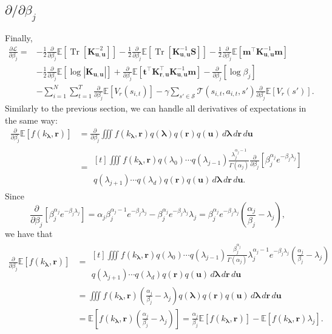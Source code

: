 \documentclass{article}
\theoremstyle{definition}
\DeclareMathOperator{\Tr}{Tr}
\newcommand{\Kuu}{\mathbf{K}_{\mathbf{u},\mathbf{u}}}
\newcommand{\Kru}{\mathbf{K}_{\mathbf{r},\mathbf{u}}}
\newcommand{\db}{\frac{\partial}{\partial\beta_j}}
\begin{document}
\subsection{$\partial/\partial\beta_j$}
Finally,
\[
  \begin{split}
    \frac{\partial\mathcal{L}}{\partial\beta_j} = &-
    \frac{1}{2}\db\mathbb{E}[\Tr[\Kuu^{-2}]] -
    \frac{1}{2}\db\mathbb{E}[\Tr[\Kuu^{-1}\mathbf{S}]] -
    \frac{1}{2}\db\mathbb{E}[\mathbf{m}^\intercal\Kuu^{-1}\mathbf{m}] \\
    &- \frac{1}{2}\db\mathbb{E}[\log|\Kuu|] +
    \db\mathbb{E}[\mathbf{t}^\intercal\Kru^\intercal\Kuu^{-1}\mathbf{m}] -
    \db[\log\beta_j] \\
    &- \sum_{i=1}^N \sum_{t=1}^T \db \mathbb{E}[V_r(s_{i,t})] - \gamma\sum_{s'
      \in \mathcal{S}} \mathcal{T}(s_{i,t}, a_{i,t}, s')\db\mathbb{E}[V_r(s')].
  \end{split}
\]
Similarly to the previous section, we can handle all derivatives of expectations
in the same way:
\[
  \begin{split}
    \db\mathbb{E}[f(k_{\bm\lambda}, \mathbf{r})] &= \db \iiint f(k_{\bm\lambda},
    \mathbf{r}) q(\bm\lambda) q(\mathbf{r})
    q(\mathbf{u})\,d\bm\lambda\,d\mathbf{r}\,d\mathbf{u} \\
    &= \!\begin{multlined}[t]
      \iiint f(k_{\bm\lambda}, \mathbf{r}) q(\lambda_0) \cdots q(\lambda_{j-1})
      \frac{\lambda_j^{\alpha_j - 1}}{\Gamma(\alpha_j)} \db [\beta_j^{\alpha_j}
      e^{-\beta_j\lambda_j}] \\
      q(\lambda_{j+1}) \cdots q(\lambda_d) q(\mathbf{r})
      q(\mathbf{u})\,d\bm\lambda\,d\mathbf{r}\,d\mathbf{u}.
    \end{multlined}
  \end{split}
\]
Since
\[ \db [\beta_j^{\alpha_j} e^{-\beta_j\lambda_j}] = \alpha_j\beta_j^{\alpha_j - 1}e^{-\beta_j\lambda_j}
  - \beta_j^{\alpha_j} e^{-\beta_j\lambda_j}\lambda_j = \beta_j^{\alpha_j}
  e^{-\beta_j\lambda_j} \left( \frac{\alpha_j}{\beta_j} - \lambda_j \right), \]
we have that
\[
  \begin{split}
    \db\mathbb{E}[f(k_{\bm\lambda}, \mathbf{r})] &= \!\begin{multlined}[t]
      \iiint f(k_{\bm\lambda}, \mathbf{r}) q(\lambda_0) \cdots q(\lambda_{j-1})
      \frac{\beta_j^{\alpha_j}}{\Gamma(\alpha_j)}\lambda_j^{\alpha_j -
        1}e^{-\beta_j\lambda_j} \left(\frac{\alpha_j}{\beta_j} - \lambda_j
      \right) \\
      q(\lambda_{j+1}) \cdots q(\lambda_d) q(\mathbf{r})
      q(\mathbf{u})\,d\bm\lambda\,d\mathbf{r}\,d\mathbf{u}
    \end{multlined}
    \\
    &= \iiint f(k_{\bm\lambda}, \mathbf{r}) \left(\frac{\alpha_j}{\beta_j} -
      \lambda_j \right) q(\bm\lambda) q(\mathbf{r})
    q(\mathbf{u})\,d\bm\lambda\,d\mathbf{r}\,d\mathbf{u} \\
    &= \mathbb{E} \left[ f(k_{\bm\lambda}, \mathbf{r})
      \left(\frac{\alpha_j}{\beta_j} - \lambda_j \right) \right] =
    \frac{\alpha_j}{\beta_j}\mathbb{E}[f(k_{\bm\lambda}, \mathbf{r})] -
    \mathbb{E}[f(k_{\bm\lambda}, \mathbf{r})\lambda_j].
  \end{split}
\]
\end{document}

